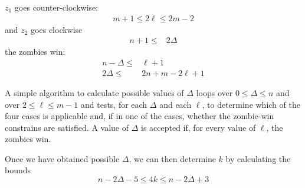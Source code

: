  $z_1$ goes counter-clockwise:
 \begin{align*}
  m + 1 \leq 2 \ell \leq 2m - 2
 \end{align*}
 and $z_2$ goes clockwise
 \begin{align*}
  n+1 \leq & 2 \Delta
 \end{align*}
 the zombies win:
 \begin{align*}
  n - \Delta \leq & \ell + 1           \\
  2 \Delta \leq   & 2n + m - 2\ell + 1
 \end{align*}

A simple algorithm to calculate possible values of $\Delta$ loops
over $0 \leq \Delta \leq n$ and over $2 \leq \ell \leq m-1$ and tests,
for each $\Delta$ and each $\ell$, to determine which of the four cases is
applicable and, if in one of the cases, whether the zombie-win constrains are
satisfied. A value of $\Delta$ is accepted if, for every value of $\ell$, the
zombies win.

Once we have obtained possible $\Delta$, we can then determine $k$ by
calculating the bounds
\[ n - 2\Delta -5 \leq 4k \leq n-2\Delta +3 \]
